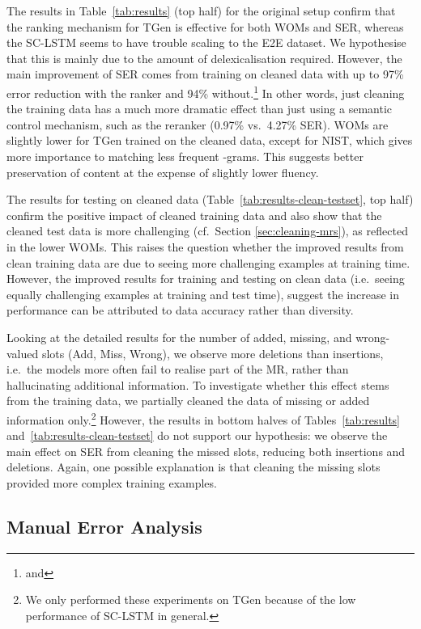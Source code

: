\documentclass[11pt,a4paper]{article}
\begin{document}
The results in Table~\ref{tab:results} (top half) for the original setup confirm that the ranking mechanism for TGen is effective for both WOMs and SER, whereas the SC-LSTM seems to have trouble scaling to the E2E dataset. 
We hypothesise that this is mainly due to the amount of delexicalisation required.
However, the main improvement of SER comes from training on cleaned data with up to 97\% error reduction with the ranker and  94\% without.\footnote{ and } 
In other words, just cleaning the training data has a much more dramatic effect than just using a semantic control mechanism, such as the reranker (0.97\% vs.\ 4.27\% SER). 
WOMs are slightly lower for TGen trained on the cleaned data, except for NIST, which gives more importance to matching less frequent -grams. 
This suggests better preservation of content at the expense of slightly lower fluency.

The results for testing on cleaned data (Table~\ref{tab:results-clean-testset}, top half) confirm the positive impact of cleaned training data and also show that the cleaned test data is more challenging (cf.\ Section \ref{sec:cleaning-mrs}), as reflected in the lower WOMs.
This raises the question whether the improved results from clean training data are due to seeing more challenging examples at training time. 
However, the improved results for training and testing on clean data (i.e.\ seeing equally challenging examples at training and test time), suggest the increase in performance can be attributed to data accuracy rather than diversity.

Looking at the detailed results for the number of added, missing, and wrong-valued slots (Add, Miss, Wrong),
we observe more deletions than insertions, i.e.\ the models more often fail to realise part of the MR, rather than hallucinating additional information. To investigate whether this effect stems from the training data, we partially cleaned the data of missing or added information only.\footnote{We only performed these experiments on TGen because of the low performance of SC-LSTM in general.} 
 However, the results in bottom halves of Tables~\ref{tab:results} and~\ref{tab:results-clean-testset} do not support our hypothesis: we observe the main effect on SER from cleaning the missed slots, reducing both insertions and deletions.
 Again, one possible explanation is that cleaning the missing slots provided more complex training examples. 






\subsection{Manual Error Analysis}
\end{document}
